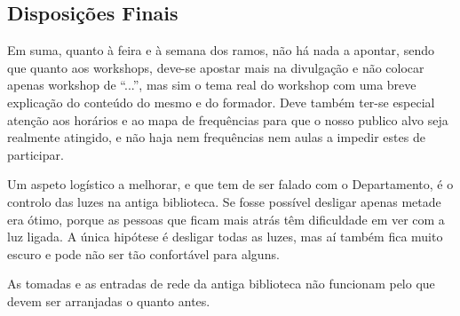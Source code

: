 















\subsection{Disposições Finais}

Em suma, quanto à feira e à semana dos ramos, não há nada a apontar, sendo que quanto aos workshops, deve-se apostar mais na divulgação e não colocar apenas workshop de “...”, mas sim o tema real do workshop com uma breve explicação do conteúdo do mesmo e do formador. Deve também ter-se especial atenção aos horários e ao mapa de frequências para que o nosso publico alvo seja realmente atingido, e não haja nem frequências nem aulas a impedir estes de participar.

Um aspeto logístico a melhorar, e que tem de ser falado com o Departamento, é o controlo das luzes na antiga biblioteca. Se fosse possível desligar apenas metade era ótimo, porque as pessoas que ficam mais atrás têm dificuldade em ver com a luz ligada. A única hipótese é desligar todas as luzes, mas aí também fica muito escuro e pode não ser tão confortável para alguns.

As tomadas e as entradas de rede da antiga biblioteca não funcionam pelo que devem ser arranjadas o quanto antes.
